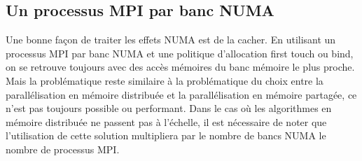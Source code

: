 \subsection{Un processus MPI par banc NUMA}
Une bonne façon de traiter les effets NUMA est de la cacher.
%
En utilisant un processus MPI par banc NUMA et une politique d'allocation first touch ou bind, on se retrouve toujours avec des accès mémoires du banc mémoire le plus proche.
%
Mais la problématique reste similaire à la problématique du choix entre la parallélisation en mémoire distribuée et la parallélisation en mémoire partagée, ce n'est pas toujours possible ou performant.
%
Dans le cas où les algorithmes en mémoire distribuée ne passent pas à l'échelle, il est nécessaire de noter que l'utilisation de cette solution multipliera par le nombre de bancs NUMA le nombre de processus MPI.

